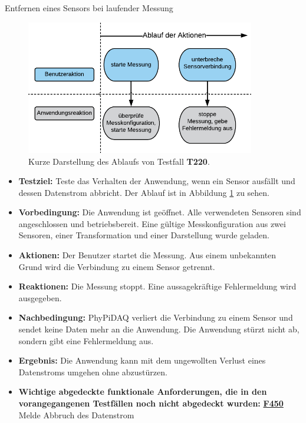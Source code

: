 \documentclass[parskip=full]{scrartcl}
\begin{document}
\begin{description}
\begin{itemize}
\end{itemize}

\hypertarget{link-t220}{\item[T220]} Entfernen eines Sensors bei laufender Messung

\begin{figure}[htbp]
	\begin{center}
		\includegraphics[width = 10cm]{Grafik/T220-Ablauf.png}
		\caption{Kurze Darstellung des Ablaufs von Testfall \textbf{T220}.}
		\label{T220-Ablauf}
	\end{center}
\end{figure}
\begin{itemize}

\item []\textbf{Testziel:} Teste das Verhalten der Anwendung, wenn ein Sensor ausfällt und dessen Datenstrom abbricht. Der Ablauf ist in Abbildung \ref{T220-Ablauf} zu sehen.

\item []\textbf{Vorbedingung:} Die Anwendung ist geöffnet. Alle verwendeten Sensoren sind angeschlossen und betriebsbereit. Eine gültige Messkonfiguration aus zwei Sensoren, einer Transformation und einer Darstellung wurde geladen.
\item []\textbf{Aktionen:} Der Benutzer startet die Messung. Aus einem unbekannten Grund wird die Verbindung zu einem Sensor getrennt.
\item []\textbf{Reaktionen:} Die Messung stoppt. Eine aussagekräftige Fehlermeldung wird ausgegeben.
\item []\textbf{Nachbedingung:} \gls{PhyPiDAQ} verliert die Verbindung zu einem Sensor und sendet keine Daten mehr an die Anwendung. Die Anwendung stürzt nicht ab, sondern gibt eine Fehlermeldung aus.

\item []\textbf{Ergebnis:} Die Anwendung kann mit dem ungewollten Verlust eines Datenstroms umgehen ohne abzustürzen.
\item []\textbf{Wichtige abgedeckte funktionale Anforderungen, die in den vorangegangenen Testfällen noch nicht abgedeckt wurden:} \hyperlink{link-f450}{\textbf{F450}} Melde Abbruch des Datenstrom

\end{itemize}


\end{description}
\end{document}
